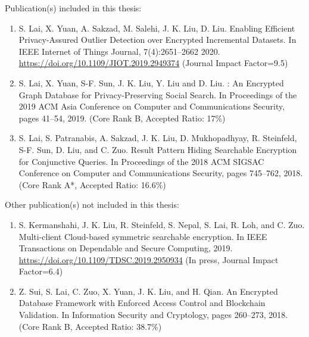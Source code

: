 \begin{publications}
Publication(s) included in this thesis:
\begin{enumerate}
	\item S. Lai, X. Yuan, A. Sakzad, M. Salehi, J. K. Liu, D. Liu. Enabling Efficient Privacy-Assured Outlier
Detection over Encrypted Incremental Datasets. In IEEE Internet of Things Journal, 7(4):2651--2662 2020. \url{https://doi.org/10.1109/JIOT.2019.2949374} (Journal Impact Factor=9.5)
	\item S. Lai, X. Yuan, S-F. Sun, J. K. Liu, Y. Liu and D. Liu. \system: An Encrypted Graph Database for Privacy-Preserving Social Search. In Proceedings of the 2019 ACM Asia Conference on Computer and Communications Security, pages 41--54, 2019. (Core Rank B, Accepted Ratio: 17\%)
	\item S. Lai, S. Patranabis, A. Sakzad, J. K. Liu, D. Mukhopadhyay, R. Steinfeld, S-F. Sun, D. Liu, and C. Zuo.  Result Pattern Hiding Searchable Encryption for Conjunctive Queries. In Proceedings of the 2018 ACM SIGSAC Conference on Computer and Communications Security, pages 745--762, 2018. (Core Rank A*, Accepted Ratio: 16.6\%)
\end{enumerate}
\vspace{14pt}
\noindent Other publication(s) not included in this thesis:
	\begin{enumerate}
		\item S. Kermanshahi, J. K. Liu, R. Steinfeld, S. Nepal, S. Lai, R. Loh, and C. Zuo. Multi-client Cloud-based symmetric searchable encryption. In IEEE Transactions on Dependable and Secure Computing, 2019. \url{https://doi.org/10.1109/TDSC.2019.2950934} (In press, Journal Impact Factor=6.4)
		\item Z. Sui, S. Lai, C. Zuo, X. Yuan, J. K. Liu, and H. Qian. An Encrypted Database Framework with Enforced Access Control and Blockchain Validation. In Information Security and Cryptology, pages 260--273, 2018. (Core Rank B, Accepted Ratio: 38.7\%)
	\end{enumerate}
\end{publications}
